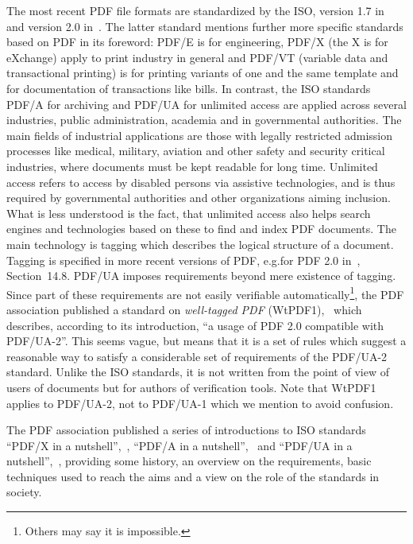 The most recent PDF file formats are standardized by the ISO, 
version 1.7 in~\cite{Pdf17} and version 2.0 in~\cite{Pdf20}. 
The latter standard mentions further more specific standards based on PDF in its foreword: 
PDF/E is for engineering, 
PDF/X (the X is for eXchange) apply to print industry in general 
and PDF/VT (variable data and transactional printing) is for printing variants of one and the same template 
and for documentation of transactions like bills. 
In contrast, the ISO standards PDF/A for archiving and PDF/UA for unlimited access 
are applied across several industries, public administration, academia and in governmental authorities. 
The main fields of industrial applications are those with legally restricted admission processes 
like medical, military, aviation and other safety and security critical industries, 
where documents must be kept readable for long time. 
Unlimited access refers to access by disabled persons via assistive technologies, 
and is thus required by governmental authorities and other organizations aiming inclusion. 
What is less understood is the fact, that unlimited access also helps search engines 
and technologies based on these to find and index PDF documents. 
The main technology is tagging which describes the logical structure of a document. 
Tagging is specified in more recent versions of PDF, 
e.g.\@ for PDF 2.0 in~\cite{Pdf20}, Section~14.8. 
PDF/UA imposes requirements beyond mere existence of tagging. 
Since part of these requirements are not easily verifiable automatically\footnote%
{Others may say it is impossible. }, 
the PDF association published a standard on \emph{well-tagged PDF} (WtPDF1),~\cite{WtPDF1} 
which describes, according to its introduction, ``a usage of PDF 2.0 compatible with PDF/UA-2''. 
This seems vague, but means that it is a set of rules 
which suggest a reasonable way to satisfy a considerable set of requirements of the PDF/UA-2 standard. 
Unlike the ISO standards, it is not written from the point of view of users of documents 
but for authors of verification tools. 
Note that WtPDF1 applies to PDF/UA-2, not to PDF/UA-1 which we mention to avoid confusion. 

The PDF association published a series of introductions to ISO standards 
``PDF/X in a nutshell'',~\cite{PDFXnut}, 
``PDF/A in a nutshell'',~\cite{PDFAnut2} and ``PDF/UA in a nutshell'',~\cite{PDFUAnut}, 
providing some history, an overview on the requirements, 
basic techniques used to reach the aims and a view on the role of the standards in society. 

